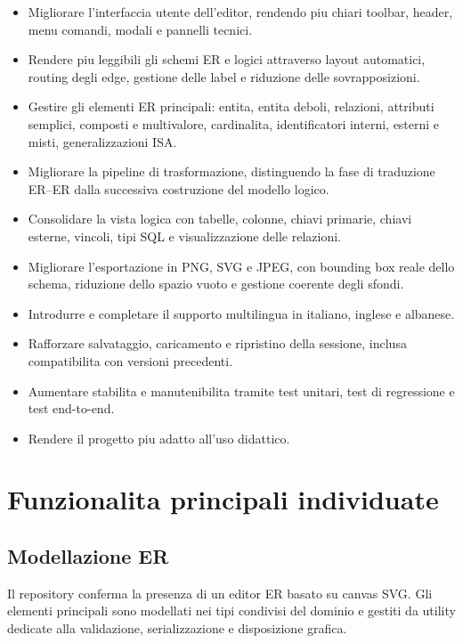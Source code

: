 \begin{itemize}
    \item Migliorare l'interfaccia utente dell'editor, rendendo piu chiari toolbar, header, menu comandi, modali e pannelli tecnici.
    \item Rendere piu leggibili gli schemi ER e logici attraverso layout automatici, routing degli edge, gestione delle label e riduzione delle sovrapposizioni.
    \item Gestire gli elementi ER principali: entita, entita deboli, relazioni, attributi semplici, composti e multivalore, cardinalita, identificatori interni, esterni e misti, generalizzazioni ISA.
    \item Migliorare la pipeline di trasformazione, distinguendo la fase di traduzione ER--ER dalla successiva costruzione del modello logico.
    \item Consolidare la vista logica con tabelle, colonne, chiavi primarie, chiavi esterne, vincoli, tipi SQL e visualizzazione delle relazioni.
    \item Migliorare l'esportazione in PNG, SVG e JPEG, con bounding box reale dello schema, riduzione dello spazio vuoto e gestione coerente degli sfondi.
    \item Introdurre e completare il supporto multilingua in italiano, inglese e albanese.
    \item Rafforzare salvataggio, caricamento e ripristino della sessione, inclusa compatibilita con versioni precedenti.
    \item Aumentare stabilita e manutenibilita tramite test unitari, test di regressione e test end-to-end.
    \item Rendere il progetto piu adatto all'uso didattico.
\end{itemize}

\section{Funzionalita principali individuate}

\subsection{Modellazione ER}

Il repository conferma la presenza di un editor ER basato su canvas SVG. Gli elementi principali sono modellati nei tipi condivisi del dominio e gestiti da utility dedicate alla validazione, serializzazione e disposizione grafica.

